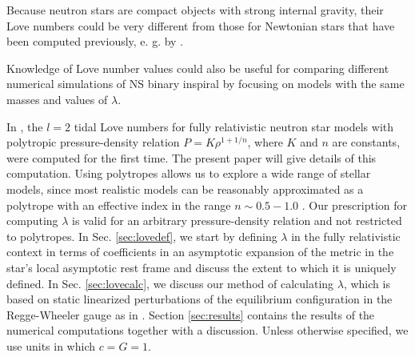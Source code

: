 \documentclass[12pt,preprint]{aastex}
\begin{document}
 Because neutron stars are compact
objects with strong internal gravity, their Love numbers could be
very different from those for Newtonian stars that have been
computed previously, e. g. by \citet{bo}.

 Knowledge of Love number values could also be useful for
comparing different numerical simulations of NS binary inspiral by
focusing on models with the same masses and values of $\lambda$.




In \citet{tidal}, the $l=2$ tidal Love numbers for fully
relativistic neutron star models with polytropic pressure-density
relation $P=K\rho^{1+1/n}$, where $K$ and $n$ are constants, were
computed for the first time. The present paper will give details of
this computation. Using polytropes allows us to explore a wide range
of stellar models, since most realistic models can be reasonably
approximated as a polytrope with an effective index in the range
$n\sim 0.5-1.0$ \cite{Lattimer}. Our prescription for computing
$\lambda$ is valid for an arbitrary pressure-density relation and
not restricted to polytropes. In Sec. \ref{sec:lovedef}, we start by
defining $\lambda$ in the fully relativistic context in terms of
coefficients in an asymptotic expansion of the metric in the star's
local asymptotic rest frame and discuss the extent to which it is
uniquely defined. In Sec. \ref{sec:lovecalc}, we discuss our method
of calculating $\lambda$, which is based on static linearized
perturbations of the equilibrium configuration in the Regge-Wheeler
gauge as in \citet{tc}. Section \ref{sec:results} contains the
results of the numerical computations together with a discussion.
Unless otherwise specified, we use units in which $c=G=1$.
\end{document}
